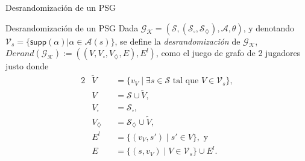\documentclass{beamer}
\newcommand{\St}{\mathcal{S}}
\newcommand{\Act}{\mathcal{A}}
\newcommand{\diam}{\diamondsuit}
\newcommand{\cuad}{\square}
\newcommand{\Gk}{\mathcal{G}_\mathcal{K}}
\newcommand{\Vs}{\mathcal{V}_s}
\newcommand{\supp}{\textsf{supp}}
\newcommand{\DGk}{Derand(\Gk)}
\begin{document}
\begin{frame}{Desrandomizaci\'on de un PSG}

	\begin{block}{Desrandomización de un PSG}
		Dada $\Gk = (\St, (\St_\cuad, \St_\diam), \Act,
			\theta)$, y denotando $\Vs=\{\supp(\alpha) | \alpha \in
			\Act(s)\}$, se define la \textit{desrandomizaci\'on} de
		$\Gk$, $\DGk := (( V, V_\cuad, V_\diam, E ), E^l )$, como el juego de grafo de
		2 jugadores justo donde
		\begin{alignat*}{2}
			&\tilde V &&= \{v_{V} \mid \exists s \in \St \text{ tal que } V \in \Vs\}, \\
			&V &&= \St \cup \tilde V, \\
			&V_\cuad &&= \St_\cuad, \\
			&V_\diam &&= \St_\diam \cup \tilde V, \\
			&E^l &&= \{(v_{V}, s') \mid s' \in V\}, \text{   y } \\
			&E &&= \{(s, v_{V}) \mid V \in \Vs\} \cup E^l.\\
		\end{alignat*}
		\vspace{-1cm}
	\end{block}

\end{frame}
\end{document}
